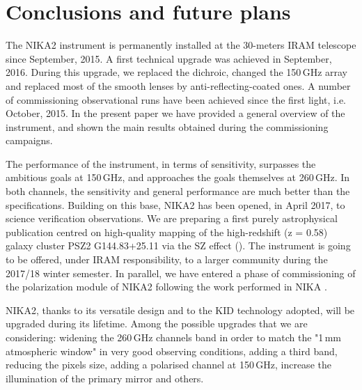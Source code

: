 \documentclass[]{aa} %
\begin{document}
%
%





\section{Conclusions and future plans}

The NIKA2 instrument is permanently installed at the 30-meters IRAM telescope since September, 2015. A first technical upgrade was achieved in September, 2016. During this upgrade, we replaced the dichroic, changed the 150\,GHz array and replaced most of the smooth lenses by anti-reflecting-coated ones. A number of commissioning observational runs have been achieved since the first light, i.e. October, 2015. In the present paper we have provided a general overview of the instrument, and shown the main results obtained during the commissioning campaigns. 

The performance of the instrument, in terms of sensitivity, surpasses the ambitious goals at 150\,GHz, and approaches the goals themselves at 260\,GHz. In both channels, the sensitivity and general performance are much better than the specifications. 
Building on this base, NIKA2 has been opened, in April 2017, to science verification observations. We are preparing a first purely astrophysical publication centred on high-quality mapping of the high-redshift (z = 0.58) galaxy cluster PSZ2 G144.83+25.11 via the SZ effect (\cite{Ruppin2017}). The instrument is going to be offered, under IRAM responsibility, to a larger community during the 2017/18 winter semester. In parallel, we have entered a phase of commissioning of the polarization module of NIKA2 following the work performed in NIKA \cite{Ritacco2017}. 

NIKA2, thanks to its versatile design and to the KID technology adopted, will be upgraded during its lifetime. Among the possible upgrades that we are considering: widening the 260\,GHz channels band in order to match the "1\,mm atmospheric window" in very good observing conditions, adding a third band, reducing the pixels size, adding a polarised channel at 150\,GHz, increase the illumination of the primary mirror and others. 
\end{document}
